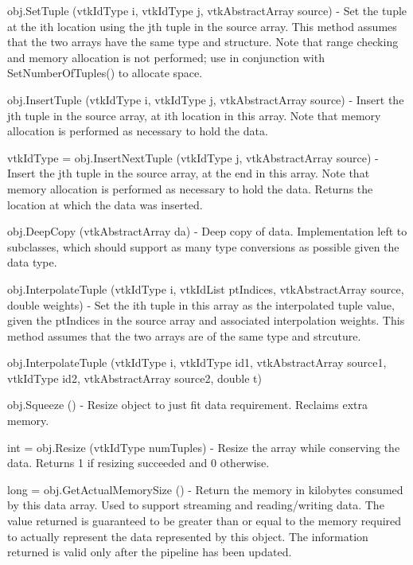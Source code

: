 \begin{DoxyItemize}
\item {\ttfamily obj.\-Set\-Tuple (vtk\-Id\-Type i, vtk\-Id\-Type j, vtk\-Abstract\-Array source)} -\/ Set the tuple at the ith location using the jth tuple in the source array. This method assumes that the two arrays have the same type and structure. Note that range checking and memory allocation is not performed; use in conjunction with Set\-Number\-Of\-Tuples() to allocate space.  
\item {\ttfamily obj.\-Insert\-Tuple (vtk\-Id\-Type i, vtk\-Id\-Type j, vtk\-Abstract\-Array source)} -\/ Insert the jth tuple in the source array, at ith location in this array. Note that memory allocation is performed as necessary to hold the data.  
\item {\ttfamily vtk\-Id\-Type = obj.\-Insert\-Next\-Tuple (vtk\-Id\-Type j, vtk\-Abstract\-Array source)} -\/ Insert the jth tuple in the source array, at the end in this array. Note that memory allocation is performed as necessary to hold the data. Returns the location at which the data was inserted.  
\item {\ttfamily obj.\-Deep\-Copy (vtk\-Abstract\-Array da)} -\/ Deep copy of data. Implementation left to subclasses, which should support as many type conversions as possible given the data type.  
\item {\ttfamily obj.\-Interpolate\-Tuple (vtk\-Id\-Type i, vtk\-Id\-List pt\-Indices, vtk\-Abstract\-Array source, double weights)} -\/ Set the ith tuple in this array as the interpolated tuple value, given the pt\-Indices in the source array and associated interpolation weights. This method assumes that the two arrays are of the same type and strcuture.  
\item {\ttfamily obj.\-Interpolate\-Tuple (vtk\-Id\-Type i, vtk\-Id\-Type id1, vtk\-Abstract\-Array source1, vtk\-Id\-Type id2, vtk\-Abstract\-Array source2, double t)}  
\item {\ttfamily obj.\-Squeeze ()} -\/ Resize object to just fit data requirement. Reclaims extra memory.  
\item {\ttfamily int = obj.\-Resize (vtk\-Id\-Type num\-Tuples)} -\/ Resize the array while conserving the data. Returns 1 if resizing succeeded and 0 otherwise.  
\item {\ttfamily long = obj.\-Get\-Actual\-Memory\-Size ()} -\/ Return the memory in kilobytes consumed by this data array. Used to support streaming and reading/writing data. The value returned is guaranteed to be greater than or equal to the memory required to actually represent the data represented by this object. The information returned is valid only after the pipeline has been updated.  

\end{DoxyItemize}
